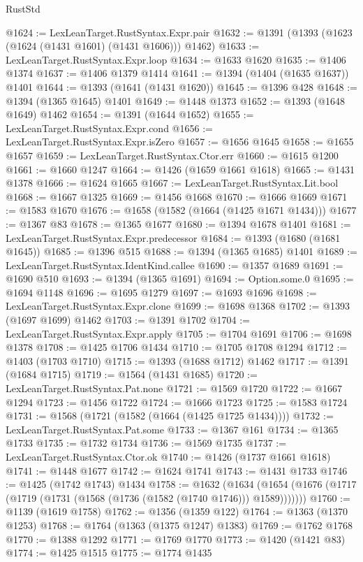 \begin{lexlean}{RustStd}
\begin{coremodule}
@1624 := LexLeanTarget.RustSyntax.Expr.pair
@1632 := @1391 (@1393 (@1623 (@1624 (@1431 @1601) (@1431 @1606))) @1462)
@1633 := LexLeanTarget.RustSyntax.Expr.loop
@1634 := @1633 @1620
@1635 := @1406 @1374
@1637 := @1406 @1379 @1414
@1641 := @1394 (@1404 (@1635 @1637)) @1401
@1644 := @1393 (@1641 (@1431 @1620))
@1645 := @1396 @428
@1648 := @1394 (@1365 @1645) @1401
@1649 := @1448 @1373
@1652 := @1393 (@1648 @1649) @1462
@1654 := @1391 (@1644 @1652)
@1655 := LexLeanTarget.RustSyntax.Expr.cond
@1656 := LexLeanTarget.RustSyntax.Expr.isZero
@1657 := @1656 @1645
@1658 := @1655 @1657
@1659 := LexLeanTarget.RustSyntax.Ctor.err
@1660 := @1615 @1200
@1661 := @1660 @1247
@1664 := @1426 (@1659 @1661 @1618)
@1665 := @1431 @1378
@1666 := @1624 @1665
@1667 := LexLeanTarget.RustSyntax.Lit.bool
@1668 := @1667 @1325
@1669 := @1456 @1668
@1670 := @1666 @1669
@1671 := @1583 @1670
@1676 := @1658 (@1582 (@1664 (@1425 @1671 @1434)))
@1677 := @1367 @83
@1678 := @1365 @1677
@1680 := @1394 @1678 @1401
@1681 := LexLeanTarget.RustSyntax.Expr.predecessor
@1684 := @1393 (@1680 (@1681 @1645))
@1685 := @1396 @515
@1688 := @1394 (@1365 @1685) @1401
@1689 := LexLeanTarget.RustSyntax.IdentKind.callee
@1690 := @1357 @1689
@1691 := @1690 @510
@1693 := @1394 (@1365 @1691)
@1694 := Option.some.{0}
@1695 := @1694 @1148
@1696 := @1695 @1279
@1697 := @1693 @1696
@1698 := LexLeanTarget.RustSyntax.Expr.clone
@1699 := @1698 @1368
@1702 := @1393 (@1697 @1699) @1462
@1703 := @1391 @1702
@1704 := LexLeanTarget.RustSyntax.Expr.apply
@1705 := @1704 @1691
@1706 := @1698 @1378
@1708 := @1425 @1706 @1434
@1710 := @1705 @1708 @1294
@1712 := @1403 (@1703 @1710)
@1715 := @1393 (@1688 @1712) @1462
@1717 := @1391 (@1684 @1715)
@1719 := @1564 (@1431 @1685)
@1720 := LexLeanTarget.RustSyntax.Pat.none
@1721 := @1569 @1720
@1722 := @1667 @1294
@1723 := @1456 @1722
@1724 := @1666 @1723
@1725 := @1583 @1724
@1731 := @1568 (@1721 (@1582 (@1664 (@1425 @1725 @1434))))
@1732 := LexLeanTarget.RustSyntax.Pat.some
@1733 := @1367 @161
@1734 := @1365 @1733
@1735 := @1732 @1734
@1736 := @1569 @1735
@1737 := LexLeanTarget.RustSyntax.Ctor.ok
@1740 := @1426 (@1737 @1661 @1618)
@1741 := @1448 @1677
@1742 := @1624 @1741
@1743 := @1431 @1733
@1746 := @1425 (@1742 @1743) @1434
@1758 := @1632
    (@1634 (@1654 (@1676 (@1717 (@1719 (@1731 (@1568 (@1736 (@1582 (@1740 @1746))) @1589)))))))
@1760 := @1139 (@1619 @1758)
@1762 := @1356 (@1359 @122)
@1764 := @1363 (@1370 @1253)
@1768 := @1764 (@1363 (@1375 @1247) @1383)
@1769 := @1762 @1768
@1770 := @1388 @1292
@1771 := @1769 @1770
@1773 := @1420 (@1421 @83)
@1774 := @1425 @1515
@1775 := @1774 @1435

\end{coremodule}
\end{lexlean}
